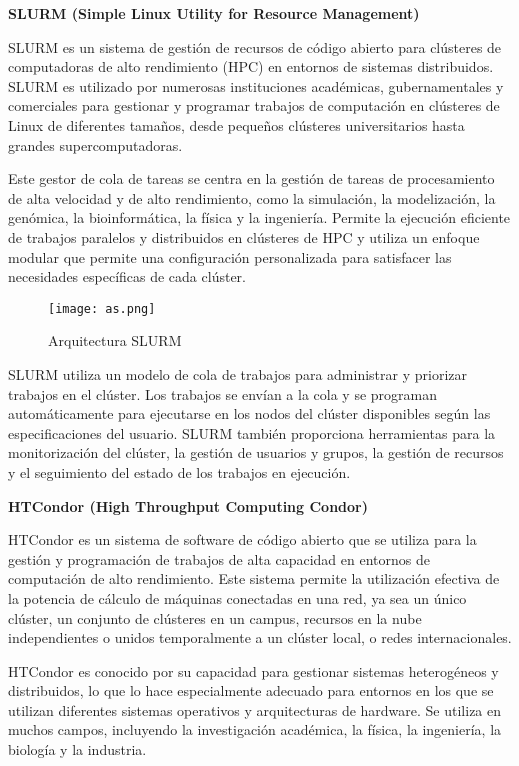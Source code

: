 \begin{spacing}{1.5}
  \textbf{SLURM (Simple Linux Utility for Resource Management)}

  SLURM es un sistema de gestión de recursos de código abierto para clústeres
  de computadoras de alto rendimiento (HPC) en entornos de sistemas distribuidos.
  SLURM es utilizado por numerosas instituciones académicas, gubernamentales y
  comerciales para gestionar y programar trabajos de computación en clústeres de
  Linux de diferentes tamaños, desde pequeños clústeres universitarios hasta
  grandes supercomputadoras. \cite{DEF-SLURM}

  Este gestor de cola de tareas se centra en la gestión de tareas de
  procesamiento de alta velocidad y de alto rendimiento, como la simulación, la
  modelización, la genómica, la bioinformática, la física y la ingeniería.
  Permite la ejecución eficiente de trabajos paralelos y distribuidos en
  clústeres de HPC y utiliza un enfoque modular que permite una configuración
  personalizada para satisfacer las necesidades específicas de cada clúster.

  \begin{figure}[h]
    \centering
    \texttt{[image: as.png]}
    \caption{Arquitectura SLURM \cite{inproceedings}}
    \label{fig:etiqueta}
  \end{figure}

  SLURM utiliza un modelo de cola de trabajos para administrar y priorizar
  trabajos en el clúster. Los trabajos se envían a la cola y se programan
  automáticamente para ejecutarse en los nodos del clúster disponibles según las
  especificaciones del usuario. SLURM también proporciona herramientas para la
  monitorización del clúster, la gestión de usuarios y grupos, la gestión de
  recursos y el seguimiento del estado de los trabajos en
  ejecución.\cite{DOC-SLURM}
  \vspace{3mm}

  \textbf{HTCondor (High Throughput Computing Condor)}

  HTCondor es un sistema de software de código abierto que se utiliza para la
  gestión y programación de trabajos de alta capacidad en entornos de computación
  de alto rendimiento. Este sistema permite la utilización efectiva de la
  potencia de cálculo de máquinas conectadas en una red, ya sea un único clúster,
  un conjunto de clústeres en un campus, recursos en la nube independientes o
  unidos temporalmente a un clúster local, o redes internacionales.
  \cite{DOC-HTCONDOR}

  HTCondor es conocido por su capacidad para gestionar sistemas heterogéneos y
  distribuidos, lo que lo hace especialmente adecuado para entornos en los que se
  utilizan diferentes sistemas operativos y arquitecturas de hardware. Se utiliza
  en muchos campos, incluyendo la investigación académica, la física, la
  ingeniería, la biología y la industria.


\end{spacing}
